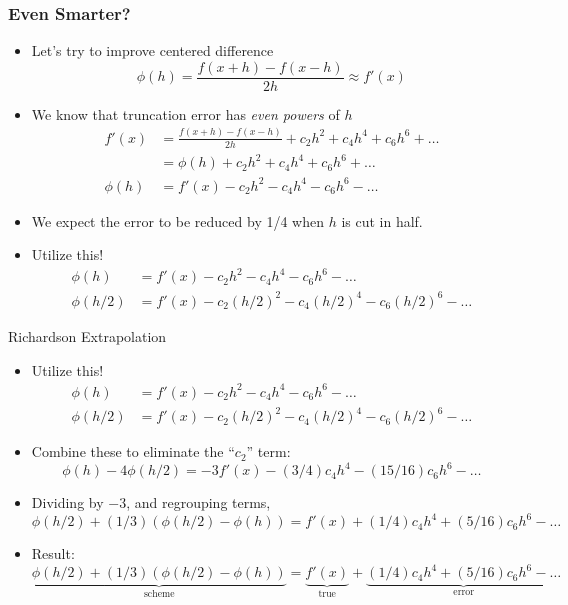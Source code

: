\documentclass[10pt]{beamer}
\begin{document}
\begin{frame}
\frametitle{Even Smarter?}
\begin{itemize}
    \item Let's try to improve centered difference
    \begin{equation*}
      \phi(h) = \frac{f(x+h) - f(x-h)}{2h} \approx f'(x)
    \end{equation*}
    \item<2-> We know that truncation error has \textit{even powers} of $h$
    \begin{align*}
      f'(x) & =  \frac{f(x+h) - f(x-h)}{2h} + c_2 h^2 + c_4 h^4 + c_6 h^6 + \dots\\
            & =  \phi(h) + c_2 h^2 + c_4 h^4 + c_6 h^6 + \dots\\
     \phi(h)& =  f'(x) - c_2 h^2 - c_4 h^4 - c_6 h^6 - \dots
    \end{align*}
    \item<3-> We expect the error to be reduced by 1/4 when $h$ is cut in half.
    \item<4-> Utilize this!
    \begin{align*}
     \phi(h)& =  f'(x) - c_2 h^2 - c_4 h^4 - c_6 h^6 - \dots\\
     \phi(h/2)& =  f'(x) - c_2 (h/2)^2 - c_4 (h/2)^4 - c_6 (h/2)^6 - \dots
    \end{align*}
\end{itemize} 
\end{frame}
\begin{frame}{Richardson Extrapolation}
\begin{itemize}
    \item Utilize this!
    \begin{align*}
     \phi(h)& =  f'(x) - c_2 h^2 - c_4 h^4 - c_6 h^6 - \dots\\
     \phi(h/2)& =  f'(x) - c_2 (h/2)^2 - c_4 (h/2)^4 - c_6 (h/2)^6 - \dots
    \end{align*}
    \item<2-> Combine these to eliminate the ``$c_2$'' term:
    \begin{equation*}
     \phi(h) - 4 \phi(h/2) =  -3 f'(x) - (3/4)c_4 h^4 - (15/16)c_6 h^6 - \dots
    \end{equation*}
    \item<3->Dividing by $-3$, and regrouping terms,
    \begin{equation*}
       \phi(h/2) + (1/3) \left( \phi(h/2) - \phi(h) \right) =  f'(x) + (1/4)c_4 h^4 + (5/16)c_6 h^6 - \dots
    \end{equation*}
    \item <4->Result: 
    \begin{equation*}
       \underbrace{\phi(h/2) + (1/3) \left( \phi(h/2) - \phi(h) \right)}_{\text{scheme}} =  \underbrace{f'(x)}_{\text{true}} + \underbrace{(1/4)c_4 h^4 + (5/16)c_6 h^6 - \dots}_{\text{error}}
    \end{equation*}
\end{itemize}
\end{frame}
\end{document}
